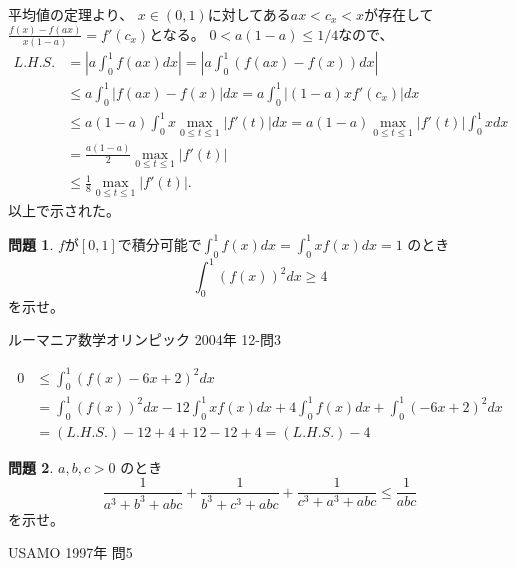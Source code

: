 \documentclass[uplatex, a5paper]{jsarticle}
\makeatletter
\theoremstyle{definition}
\newtheorem{prob}{問題}
\renewenvironment{proof}[1][\proofname]{
  \pushQED{\qed}%
  \normalfont \topsep6\p@\@plus6\p@\relax
  \trivlist
  \item[\hskip\labelsep
    #1\@addpunct{\textbf{.}}]\ignorespaces
}{%
  \popQED\endtrivlist\@endpefalse
}
\providecommand{\proofname}{証明}
\newcommand{\lhs }{ L.H.S. }
\def\qed{\hfill $\Box$}
\makeatother
\begin{document}
\begin{proof}
  平均値の定理より、
  \(x\in (0,1)\)に対してある\(ax < c_x < x\)が存在して
  \(\displaystyle\frac{f(x)-f(ax)}{x(1-a)} = f'(c_x)\)となる。
  \(0 < a(1-a) \leq 1/4\)なので、
  \begin{align*}
    \lhs &= \left| a \int_0^1 f(ax)dx \right| = \left| a\int_0^1 \left( f(ax) -f(x) \right) dx \right| \\
    &\leq a\int_0^1 \left|  f(ax) -f(x) \right| dx = a\int_0^1 \left| (1-a)xf'(c_x ) \right| dx \\
    &\leq a(1-a)\int_0^1 x \max_{0\leq t \leq 1} |f'(t)| dx = a(1-a)\max_{0\leq t \leq 1} |f'(t)| \int_0^1 x dx \\
    &= \frac{a(1-a)}{2}\max_{0\leq t \leq 1}|f'(t)| \\
    &\leq \frac{1}{8} \max_{0\leq t \leq 1}|f'(t)|.
  \end{align*}
  以上で示された。
\end{proof}










\newpage

\begin{prob}
  \(f\)が\([0,1]\)で積分可能で\(\int_0^1 f(x)dx = \int_0^1 xf(x)dx =1\)
  のとき
  \[
  \int_0^1 \left( f(x) \right) ^2 dx \geq 4
  \]
  を示せ。
  \begin{flushright}
    ルーマニア数学オリンピック 2004年 12-問3
  \end{flushright}
\end{prob}


\begin{proof}
  \begin{align*}
    0 &\leq \int_0^1 \left( f(x) - 6x + 2 \right) ^2 dx \\
    &= \int_0^1 \left( f(x) \right) ^2 dx - 12\int_0^1 xf(x)dx
    + 4\int_0^1 f(x)dx + \int_0^1 \left( - 6x + 2 \right) ^2 dx \\
    &= ( \lhs ) - 12 + 4 + 12-12+4 = ( \lhs ) -4
  \end{align*}
\end{proof}










\newpage

\begin{prob}
  \(a,b,c>0\)
  のとき
  \[
  \frac{1}{a^3+b^3+abc} + \frac{1}{b^3+c^3+abc} + \frac{1}{c^3+a^3+abc} \leq \frac{1}{abc}
  \]
  を示せ。
  \begin{flushright}
    USAMO 1997年 問5
  \end{flushright}
\end{prob}
\end{document}
